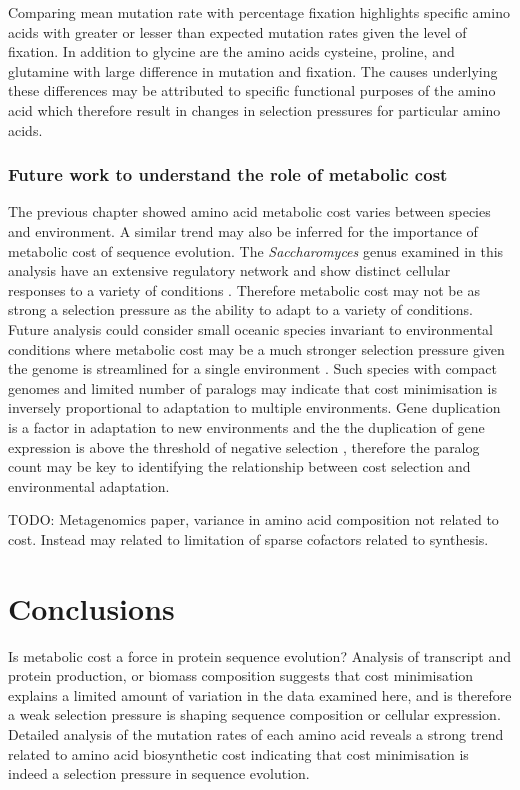 Comparing mean mutation rate with percentage fixation highlights specific amino acids with greater or lesser than expected mutation rates given the level of fixation. In addition to glycine are the amino acids cysteine, proline, and glutamine with large difference in mutation and fixation. The causes underlying these differences may be attributed to specific functional purposes of the amino acid which therefore result in changes in selection pressures for particular amino acids.

\subsubsection{Future work to understand the role of metabolic cost}

The previous chapter showed amino acid metabolic cost varies between species and environment. A similar trend may also be inferred for the importance of metabolic cost of sequence evolution. The \emph{Saccharomyces} genus examined in this analysis have an extensive regulatory network and show distinct cellular responses to a variety of conditions \cite{castrillo2007}. Therefore metabolic cost may not be as strong a selection pressure as the ability to adapt to a variety of conditions. Future analysis could consider small oceanic species invariant to environmental conditions where metabolic cost may be a much stronger selection pressure given the genome is streamlined for a single environment \cite{peligabacter}. Such species with compact genomes and limited number of paralogs may indicate that cost minimisation is inversely proportional to adaptation to multiple environments. Gene duplication is a factor in adaptation to new environments \cite{ryan,envirologs} and the the duplication of gene expression is above the threshold of negative selection \cite{swire2007}, therefore the paralog count may be key to identifying the relationship between cost selection and environmental adaptation.

TODO: Metagenomics paper, variance in amino acid composition not related to cost. Instead may related to limitation of sparse cofactors related to synthesis.

\section{Conclusions}

Is metabolic cost a force in protein sequence evolution? Analysis of transcript and protein production, or biomass composition suggests that cost minimisation explains a limited amount of variation in the data examined here, and is therefore a weak selection pressure is shaping sequence composition or cellular expression. Detailed analysis of the mutation rates of each amino acid reveals a strong trend related to amino acid biosynthetic cost indicating that cost minimisation is indeed a selection pressure in sequence evolution.
